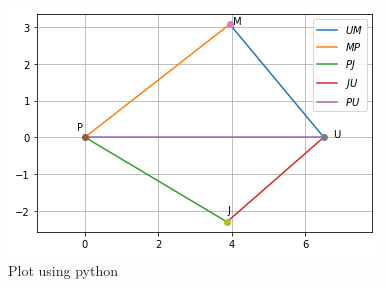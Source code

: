 \begin{figure}[!h]
 \centering
 \includegraphics[width=\columnwidth]{solutions/aug/2/3/figs/Assignment3.png}
 \caption{Plot using python}
 \label{aug/2/3/plot}
\end{figure}


